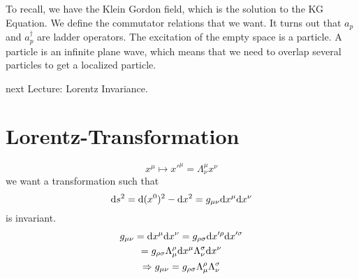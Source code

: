 \documentclass[]{scrartcl}
\begin{document}
To recall, we have the Klein Gordon field, which is the solution to the KG Equation. We define the commutator relations that we want. It turns out that $a_p$ and $a_p^\dagger$ are ladder operators. The excitation of the empty space is a particle. A particle is an infinite plane wave, which means that we need to overlap several particles to get a localized particle. 

next Lecture: Lorentz Invariance.

\section{Lorentz-Transformation}

\begin{equation}
	x^\mu \mapsto x'^\mu = \Lambda^\mu_\nu x^\nu
\end{equation}
we want a transformation such that
\begin{equation}
	\text ds^2 = \text d (x^0)^2 - \text d x^2 = g_{\mu\nu}\text dx^\mu \text dx^\nu
\end{equation}
is invariant.
\begin{gather}
	g_{\mu\nu} = \text d x^\mu \text d x^\nu = g_{\rho\sigma}\text d x'^\rho \text d x'^\sigma\\
	= g_{\rho\sigma}\Lambda^\rho_\mu \text d x^\mu \Lambda^\sigma_\nu \text d x^\nu\\
	\Rightarrow g_{\mu\nu} = g_{\rho\sigma}\Lambda^\rho_\mu \Lambda^\sigma_\nu
\end{gather}
\end{document}
